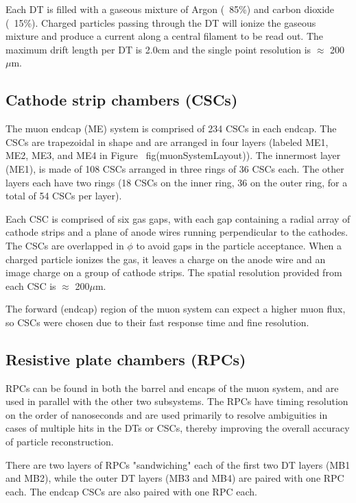 Each DT is filled with a gaseous mixture of Argon (~85\%) and carbon dioxide (~15\%). Charged particles passing through the DT will ionize the gaseous mixture and produce a current along a central filament to be read out. The maximum drift length per DT is 2.0cm and the single point resolution is $\approx$ 200 $\mu$m.

\subsection{Cathode strip chambers (CSCs)}

The muon endcap (ME) system is comprised of 234 CSCs in each endcap. The CSCs are trapezoidal in shape and are arranged in four layers  (labeled ME1, ME2, ME3, and ME4 in Figure ~fig(muonSystemLayout)). The innermost layer (ME1), is made of 108 CSCs arranged in three rings of 36 CSCs each. The other layers each have two rings (18 CSCs on the inner ring, 36 on the outer ring, for a total of 54 CSCs per layer).

Each CSC is comprised of six gas gaps, with each gap containing a radial array of cathode strips and a plane of anode wires running perpendicular to the cathodes. The CSCs are overlapped in $\phi$ to avoid gaps in the particle acceptance. When a charged particle ionizes the gas, it leaves a charge on the anode wire and an image charge on a group of cathode strips. The spatial resolution provided from each CSC is $\approx$ 200$\mu$m.

The forward (endcap) region of the muon system can expect a higher muon flux, so CSCs were chosen due to their fast response time and fine resolution.

\subsection{Resistive plate chambers (RPCs)}

RPCs can be found in both the barrel and encaps of the muon system, and are used in parallel with the other two subsystems. The RPCs have timing resolution on the order of nanoseconds and are used primarily to resolve ambiguities in cases of multiple hits in the DTs or CSCs, thereby improving the overall accuracy of particle reconstruction.

There are two layers of RPCs "sandwiching" each of the first two DT layers (MB1 and MB2), while the outer DT layers (MB3 and MB4) are paired with one RPC each. The endcap CSCs are also paired with one RPC each. 

